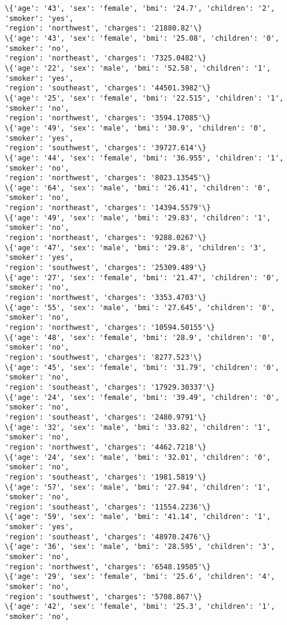 \documentclass[11pt]{article}
\begin{document}
\begin{Verbatim}[commandchars=\\\{\}]
\{'age': '43', 'sex': 'female', 'bmi': '24.7', 'children': '2', 'smoker': 'yes',
'region': 'northwest', 'charges': '21880.82'\}
\{'age': '43', 'sex': 'female', 'bmi': '25.08', 'children': '0', 'smoker': 'no',
'region': 'northeast', 'charges': '7325.0482'\}
\{'age': '22', 'sex': 'male', 'bmi': '52.58', 'children': '1', 'smoker': 'yes',
'region': 'southeast', 'charges': '44501.3982'\}
\{'age': '25', 'sex': 'female', 'bmi': '22.515', 'children': '1', 'smoker': 'no',
'region': 'northwest', 'charges': '3594.17085'\}
\{'age': '49', 'sex': 'male', 'bmi': '30.9', 'children': '0', 'smoker': 'yes',
'region': 'southwest', 'charges': '39727.614'\}
\{'age': '44', 'sex': 'female', 'bmi': '36.955', 'children': '1', 'smoker': 'no',
'region': 'northwest', 'charges': '8023.13545'\}
\{'age': '64', 'sex': 'male', 'bmi': '26.41', 'children': '0', 'smoker': 'no',
'region': 'northeast', 'charges': '14394.5579'\}
\{'age': '49', 'sex': 'male', 'bmi': '29.83', 'children': '1', 'smoker': 'no',
'region': 'northeast', 'charges': '9288.0267'\}
\{'age': '47', 'sex': 'male', 'bmi': '29.8', 'children': '3', 'smoker': 'yes',
'region': 'southwest', 'charges': '25309.489'\}
\{'age': '27', 'sex': 'female', 'bmi': '21.47', 'children': '0', 'smoker': 'no',
'region': 'northwest', 'charges': '3353.4703'\}
\{'age': '55', 'sex': 'male', 'bmi': '27.645', 'children': '0', 'smoker': 'no',
'region': 'northwest', 'charges': '10594.50155'\}
\{'age': '48', 'sex': 'female', 'bmi': '28.9', 'children': '0', 'smoker': 'no',
'region': 'southwest', 'charges': '8277.523'\}
\{'age': '45', 'sex': 'female', 'bmi': '31.79', 'children': '0', 'smoker': 'no',
'region': 'southeast', 'charges': '17929.30337'\}
\{'age': '24', 'sex': 'female', 'bmi': '39.49', 'children': '0', 'smoker': 'no',
'region': 'southeast', 'charges': '2480.9791'\}
\{'age': '32', 'sex': 'male', 'bmi': '33.82', 'children': '1', 'smoker': 'no',
'region': 'northwest', 'charges': '4462.7218'\}
\{'age': '24', 'sex': 'male', 'bmi': '32.01', 'children': '0', 'smoker': 'no',
'region': 'southeast', 'charges': '1981.5819'\}
\{'age': '57', 'sex': 'male', 'bmi': '27.94', 'children': '1', 'smoker': 'no',
'region': 'southeast', 'charges': '11554.2236'\}
\{'age': '59', 'sex': 'male', 'bmi': '41.14', 'children': '1', 'smoker': 'yes',
'region': 'southeast', 'charges': '48970.2476'\}
\{'age': '36', 'sex': 'male', 'bmi': '28.595', 'children': '3', 'smoker': 'no',
'region': 'northwest', 'charges': '6548.19505'\}
\{'age': '29', 'sex': 'female', 'bmi': '25.6', 'children': '4', 'smoker': 'no',
'region': 'southwest', 'charges': '5708.867'\}
\{'age': '42', 'sex': 'female', 'bmi': '25.3', 'children': '1', 'smoker': 'no',

\end{Verbatim}
\end{document}
